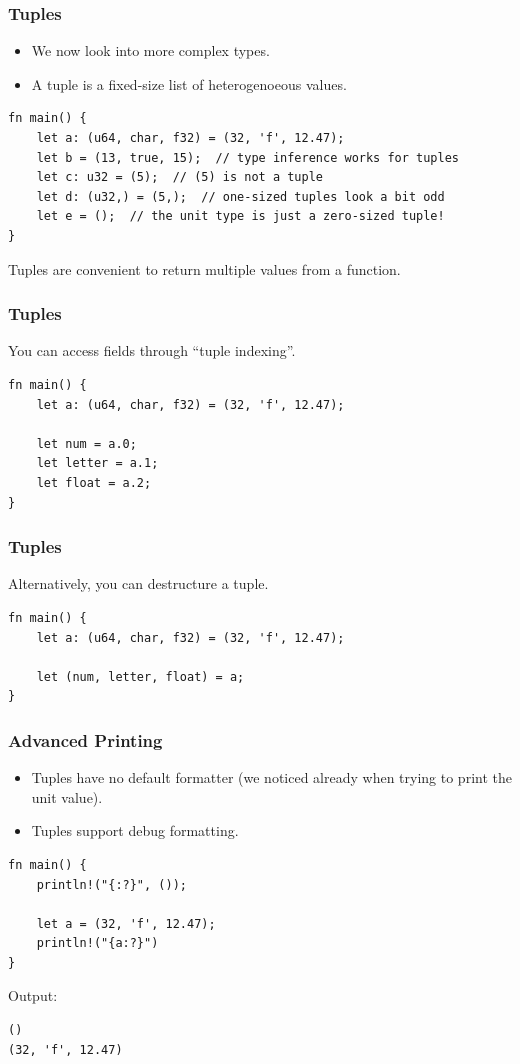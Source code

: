 \begin{frame}[fragile]
    \frametitle{Tuples}
    \begin{itemize}
        \item We now look into more complex types.
        \item A tuple is a fixed-size list of heterogenoeous values.
    \end{itemize}
    \pause
    \vfill
    \begin{verbatim}
fn main() {
    let a: (u64, char, f32) = (32, 'f', 12.47);
    let b = (13, true, 15);  // type inference works for tuples
    let c: u32 = (5);  // (5) is not a tuple
    let d: (u32,) = (5,);  // one-sized tuples look a bit odd
    let e = ();  // the unit type is just a zero-sized tuple!
}
    \end{verbatim}
    \pause
    \vfill
    Tuples are convenient to return multiple values from a function.
\end{frame}

\begin{frame}[fragile]
    \frametitle{Tuples}
    You can access fields through ``tuple indexing''.   
    \pause
    \vfill
    \begin{verbatim}
fn main() {
    let a: (u64, char, f32) = (32, 'f', 12.47);

    let num = a.0;
    let letter = a.1;
    let float = a.2;
}
    \end{verbatim}
\end{frame}

\begin{frame}[fragile]
    \frametitle{Tuples}
    Alternatively, you can destructure a tuple.
    \pause
    \vfill
    \begin{verbatim}
fn main() {
    let a: (u64, char, f32) = (32, 'f', 12.47);

    let (num, letter, float) = a;
}
    \end{verbatim}
\end{frame}

\begin{frame}[fragile]
    \frametitle{Advanced Printing}
    \begin{itemize}
        \item Tuples have no default formatter (we noticed already when trying to print the unit value).
        \item Tuples support debug formatting.
    \end{itemize}
    \pause
    \vfill
    \begin{verbatim}
fn main() {
    println!("{:?}", ());
    
    let a = (32, 'f', 12.47);
    println!("{a:?}")
}
    \end{verbatim}
    Output:
    \begin{verbatim}
()
(32, 'f', 12.47)
    \end{verbatim}
\end{frame}

